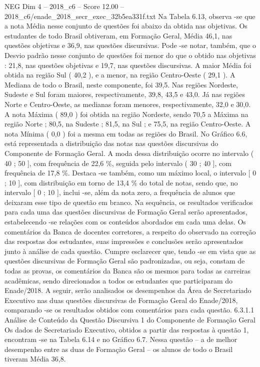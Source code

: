 \begin{textsample}{NEG Dim 4 – 2018\_c6 – Score 12.00 – 2018\_c6/enade\_2018\_secr\_exec\_32b5ea331f.txt}
Na Tabela 6.13, observa -se que a nota Média nesse conjunto de questões foi abaixo da obtida nas objetivas.
Os estudantes de todo Brasil obtiveram, em Formação Geral, Média 46,1, nas questões objetivas e 36,9, nas questões discursivas.
Pode -se notar, também, que o Desvio padrão nesse conjunto de questões foi menor do que o obtido nas objetivas : 21,8, nas questões objetivas e 19,7, nas questões discursivas.
A maior Média foi obtida na região Sul ( 40,2 ), e a menor, na região Centro-Oeste ( 29,1 ).
A Mediana de todo o Brasil, neste componente, foi 39,5.
Nas regiões Nordeste, Sudeste e Sul foram maiores, respectivamente, 39,8, 43,5 e 43,0.
Já nas regiões Norte e Centro-Oeste, as medianas foram menores, respectivamente, 32,0 e 30,0.
A nota Máxima ( 89,0 ) foi obtida na região Nordeste, sendo 70,5 a Máxima na região Norte ; 80,5, na Sudeste ; 81,5, na Sul ; e 75,5, na região Centro-Oeste.
A nota Mínima ( 0,0 ) foi a mesma em todas as regiões do Brasil.
No Gráfico 6.6, está representada a distribuição das notas nas questões discursivas do Componente de Formação Geral.
A moda dessa distribuição ocorre no intervalo ( 40 ; 50 ], com frequência de 22,6 \%, seguida pelo intervalo ( 30 ; 40 ], com frequência de 17,8 \%.
Destaca -se também, como um máximo local, o intervalo [ 0 ; 10 ], com distribuição em torno de 13,4 \% do total de notas, sendo que, no intervalo [ 0 ; 10 ], inclui -se, além da nota zero, a frequência de alunos que deixaram esse tipo de questão em branco.
Na sequência, os resultados verificados para cada uma das questões discursivas de Formação Geral serão apresentados, estabelecendo -se relações com os conteúdos abordados em cada uma delas.
Os comentários da Banca de docentes corretores, a respeito do observado na correção das respostas dos estudantes, suas impressões e conclusões serão apresentados junto à análise de cada questão.
Cumpre esclarecer que, tendo -se em vista que as questões discursivas de Formação Geral são padronizadas, ou seja, constam de todas as provas, os comentários da Banca são os mesmos para todas as carreiras acadêmicas, sendo direcionados a todos os estudantes que participaram do Enade/2018.
A seguir, serão analisados os desempenhos da Área de Secretariado Executivo nas duas questões discursivas de Formação Geral do Enade/2018, comparando -se os resultados obtidos com comentários para cada questão. 6.3.1.1 Análise de Conteúdo da Questão Discursiva 1 do Componente de Formação Geral Os dados de Secretariado Executivo, obtidos a partir das respostas à questão 1, encontram -se na Tabela 6.14 e no Gráfico 6.7.
Nessa questão – a de melhor desempenho entre as duas de Formação Geral – os alunos de todo o Brasil tiveram Média 36,8.

\end{textsample}
